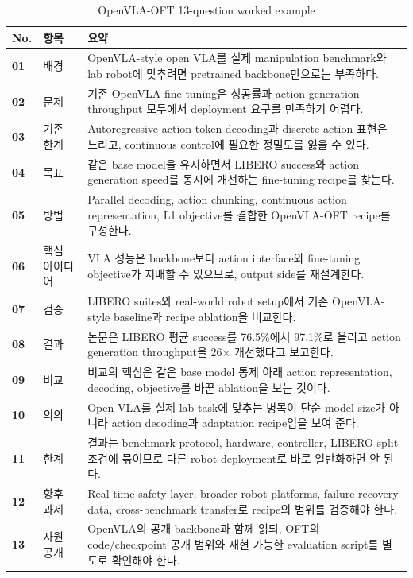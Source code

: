 \begin{table}[t]
  \centering
  \small
  \caption{OpenVLA-OFT 13-question worked example}
  \label{tab:openvla_oft_worked_example}
  \begin{tabularx}{\textwidth}{>{\bfseries}p{8mm}p{24mm}X}
    \toprule
    No. & 항목 & 요약 \\
    \midrule
    01 & 배경 & OpenVLA-style open VLA를 실제 manipulation benchmark와 lab robot에 맞추려면 pretrained backbone만으로는 부족하다. \\
    02 & 문제 & 기존 OpenVLA fine-tuning은 성공률과 action generation throughput 모두에서 deployment 요구를 만족하기 어렵다. \\
    03 & 기존 한계 & Autoregressive action token decoding과 discrete action 표현은 느리고, continuous control에 필요한 정밀도를 잃을 수 있다. \\
    04 & 목표 & 같은 base model을 유지하면서 LIBERO success와 action generation speed를 동시에 개선하는 fine-tuning recipe를 찾는다. \\
    05 & 방법 & Parallel decoding, action chunking, continuous action representation, L1 objective를 결합한 OpenVLA-OFT recipe를 구성한다. \\
    06 & 핵심 아이디어 & VLA 성능은 backbone보다 action interface와 fine-tuning objective가 지배할 수 있으므로, output side를 재설계한다. \\
    07 & 검증 & LIBERO suites와 real-world robot setup에서 기존 OpenVLA-style baseline과 recipe ablation을 비교한다. \\
    08 & 결과 & 논문은 LIBERO 평균 success를 76.5\%에서 97.1\%로 올리고 action generation throughput을 26\(\times\) 개선했다고 보고한다. \\
    09 & 비교 & 비교의 핵심은 같은 base model 통제 아래 action representation, decoding, objective를 바꾼 ablation을 보는 것이다. \\
    10 & 의의 & Open VLA를 실제 lab task에 맞추는 병목이 단순 model size가 아니라 action decoding과 adaptation recipe임을 보여 준다. \\
    11 & 한계 & 결과는 benchmark protocol, hardware, controller, LIBERO split 조건에 묶이므로 다른 robot deployment로 바로 일반화하면 안 된다. \\
    12 & 향후 과제 & Real-time safety layer, broader robot platforms, failure recovery data, cross-benchmark transfer로 recipe의 범위를 검증해야 한다. \\
    13 & 자원 공개 & OpenVLA의 공개 backbone과 함께 읽되, OFT의 code/checkpoint 공개 범위와 재현 가능한 evaluation script를 별도로 확인해야 한다. \\
    \bottomrule
  \end{tabularx}
\end{table}

